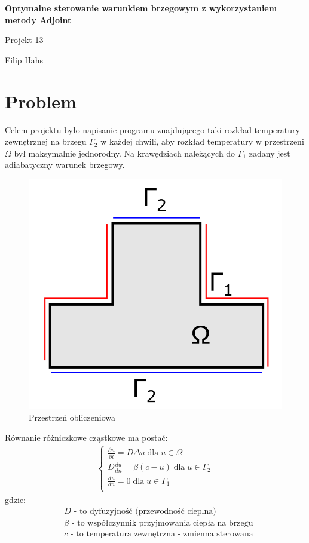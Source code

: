 \documentclass{article}
\begin{document}
	
	\begin{titlepage}
		
		
		
		\vspace{5cm}
		
		\begin{center}
			\vspace*{1cm}
			
			{\Huge \textbf{Optymalne sterowanie warunkiem brzegowym z wykorzystaniem metody Adjoint}}
			
			\vspace{0.5cm}
			{\huge Projekt 13}
			
			\vspace{1.5cm}
			\large{Filip Hahs}
			
			
		\end{center}
		\vfill
		
		
	\end{titlepage}
	\section{Problem}
Celem projektu było napisanie programu znajdującego taki rozkład temperatury zewnętrznej na brzegu $\Gamma_2$ w każdej chwili, aby rozkład temperatury w przestrzeni $\Omega$ był maksymalnie jednorodny. Na krawędziach należących do $\Gamma_1$ zadany jest adiabatyczny warunek brzegowy. 
\begin{figure}[H]
	\centering
	\includegraphics[width=0.5\linewidth]{plyta}
	\caption{Przestrzeń obliczeniowa}
	\label{fig:plyta}
\end{figure}
Równanie różniczkowe cząstkowe ma postać:
\begin{align*}
	\begin{cases}
		\frac{\partial u}{\partial t} = D\Delta u\; \text{dla}\; u\in\Omega\\
		D\frac{du}{dn} = \beta(c-u) \; \text{dla}\; u\in\Gamma_2\\
		\frac{du}{dn} = 0 \; \text{dla}\; u\in\Gamma_1\\
	\end{cases}
\end{align*}
gdzie:
\begin{align*}
	&D \text{ - to dyfuzyjność (przewodność cieplna)}\\
	&\beta \text{ - to współczynnik przyjmowania ciepła na brzegu}\\
	&c \text{ - to temperatura zewnętrzna - zmienna sterowana}
\end{align*}	
\end{document}
